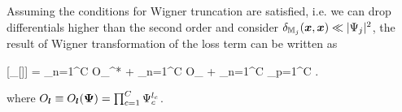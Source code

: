 \begin{theorem}
	Assuming the conditions for Wigner truncation are satisfied, i.e. we can drop differentials higher than the second order and consider $\delta_{\mathbb{M}_j}(\boldsymbol{x}, \boldsymbol{x}) \ll | \Psi_j |^2$, the result of Wigner transformation of the loss term can be written as
	\begin{eqn*}
		[_{\lvec}[\hat{\rho}]]
		= \sum_{n=1}^C
				  O_{\lvec}^*
		+ \sum_{n=1}^C
			  O_{\lvec}
		+ \sum_{n=1}^C \sum_{p=1}^C
			.
	\end{eqn*}
	where $O_{\boldsymbol{l}} \equiv O_{\boldsymbol{l}}(\boldsymbol{\Psi}) = \prod_{c=1}^C \Psi_c^{l_c}$.
\end{theorem}
